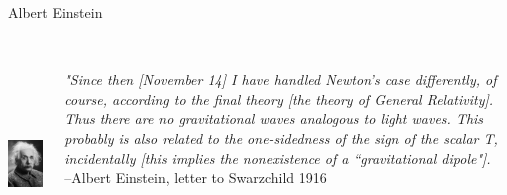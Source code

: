 \documentclass[aspectratio=169,xcolor=dvipsnames]{beamer}
\begin{document}
\begin{frame}{Albert Einstein}
    \begin{columns}[t]
    \begin{column}{4cm}

    \includegraphics[height=6cm]{einstein.jpg}
    \end{column}
    \begin{column}{7cm}


  
    \begin{varblock}
    \\
    \textit{"Since then [November 14] I have handled Newton’s case differently, of course, according to the final theory [the theory of General Relativity]. Thus there are no gravitational waves analogous to light waves. This probably is also related to the one-sidedness of the sign of the scalar T, incidentally [this implies the nonexistence of a “gravitational dipole"].}
    \\
    \vspace{2cm}
    --Albert Einstein, letter to Swarzchild 1916
    \end{varblock}
    \end{column}
    \end{columns}
     
\end{frame}
\end{document}

